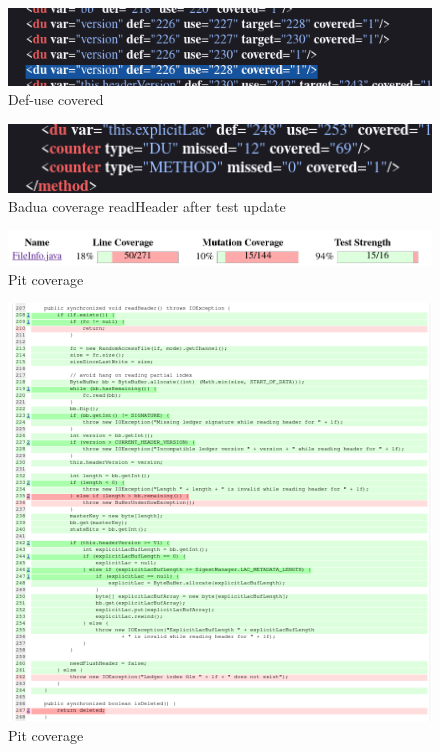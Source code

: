 \documentclass[10pt, a4paper]{article}
\begin{document}
  \begin{figure}
    \includegraphics[width=\linewidth]{./images/file_info/BaduaCoverageReadHeader3.png}
    \caption{Def-use covered}
    \label{fig:BaduaCoverageReadHeader3}
  \end{figure}

  \begin{figure}
    \includegraphics[width=\linewidth]{./images/file_info/BaduaCoverageReadHeader4.png}
    \caption{Badua coverage readHeader after test update}
    \label{fig:BaduaCoverageReadHeader4}
  \end{figure}

  \begin{figure}
    \includegraphics[width=\linewidth]{./images/file_info/PitCoverageReadHeader1.png}
    \caption{Pit coverage}
    \label{fig:PitCoverageReadHeader1}
  \end{figure}
  
  \begin{figure}
    \includegraphics[width=\linewidth]{./images/file_info/PitCoverageReadHeader2.png}
    \caption{Pit coverage}
    \label{fig:PitCoverageReadHeader2}
  \end{figure}
  
\end{document}
